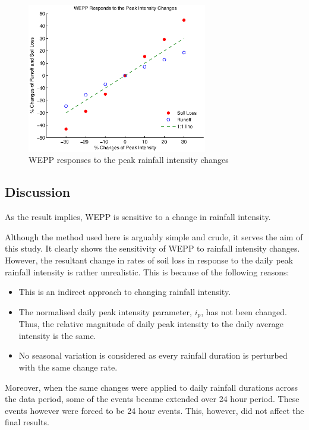 \begin{figure}[htbp]
  \centering
    \includegraphics[width=0.70\textwidth]
{./img/wepp_respond_to_int_changes}
  \caption{WEPP responses to the peak rainfall intensity changes}
  \label{fig:wepp_respond_to_int_changes}
\end{figure}

\subsection{Discussion}
\label{sec:SensitivityOfWEPPToRainfallIntensityChangesDiscussion}
As the result implies, WEPP is sensitive to a change in rainfall intensity.

Although the method used here is arguably simple and crude, it serves the aim of
this study. It clearly shows the sensitivity of WEPP to rainfall intensity
changes. However, the resultant change in rates of soil loss in response to the
daily peak rainfall intensity is rather unrealistic.
This is because of the following reasons:
\begin{itemize}
  \item This is an indirect approach to changing rainfall intensity.
  \item The normalised daily peak intensity parameter, $i_p$, has not been
changed. Thus, the relative magnitude of daily peak intensity to the daily
average intensity is the same.
  \item No seasonal variation is considered as every rainfall duration is
perturbed with the same change rate.
\end{itemize}

Moreover, when the same changes were applied to daily rainfall durations across
the data period, some of the events became extended over 24 hour period. These
events however were forced to be 24 hour events. This, however, did not affect
the final results.


